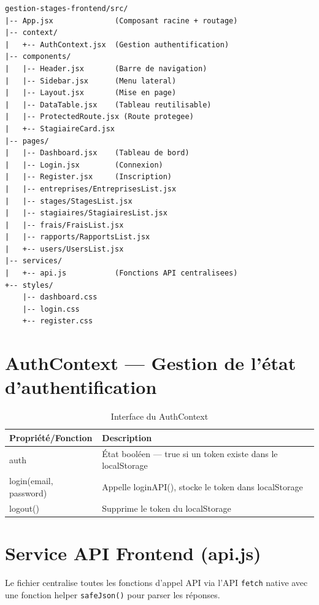 \documentclass[12pt,a4paper]{report}
\begin{document}
\begin{lstlisting}[caption=Arborescence du frontend]
gestion-stages-frontend/src/
|-- App.jsx              (Composant racine + routage)
|-- context/
|   +-- AuthContext.jsx  (Gestion authentification)
|-- components/
|   |-- Header.jsx       (Barre de navigation)
|   |-- Sidebar.jsx      (Menu lateral)
|   |-- Layout.jsx       (Mise en page)
|   |-- DataTable.jsx    (Tableau reutilisable)
|   |-- ProtectedRoute.jsx (Route protegee)
|   +-- StagiaireCard.jsx
|-- pages/
|   |-- Dashboard.jsx    (Tableau de bord)
|   |-- Login.jsx        (Connexion)
|   |-- Register.jsx     (Inscription)
|   |-- entreprises/EntreprisesList.jsx
|   |-- stages/StagesList.jsx
|   |-- stagiaires/StagiairesList.jsx
|   |-- frais/FraisList.jsx
|   |-- rapports/RapportsList.jsx
|   +-- users/UsersList.jsx
|-- services/
|   +-- api.js           (Fonctions API centralisees)
+-- styles/
    |-- dashboard.css
    |-- login.css
    +-- register.css
\end{lstlisting}

\section{AuthContext --- Gestion de l'état d'authentification}

\begin{table}[H]
\centering
\begin{tabular}{|l|p{9cm}|}
\hline
\textbf{Propriété/Fonction} & \textbf{Description} \\ \hline
auth & État booléen --- true si un token existe dans le localStorage \\ \hline
login(email, password) & Appelle loginAPI(), stocke le token dans localStorage \\ \hline
logout() & Supprime le token du localStorage \\ \hline
\end{tabular}
\caption{Interface du AuthContext}
\end{table}

\section{Service API Frontend (api.js)}

Le fichier centralise toutes les fonctions d'appel API via l'API \texttt{fetch} native avec une fonction helper \texttt{safeJson()} pour parser les réponses.
\end{document}
